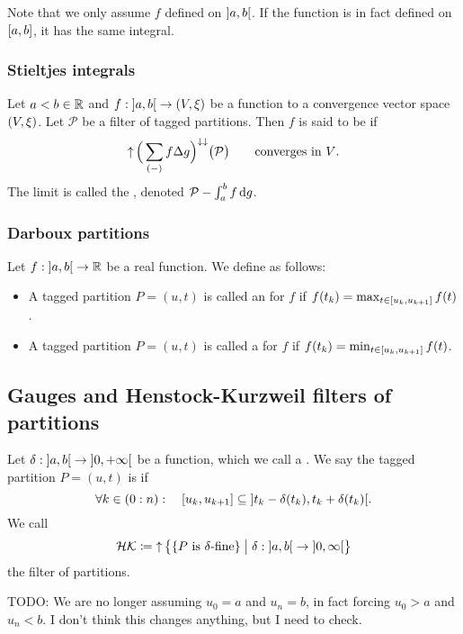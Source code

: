 Note that we only assume $f$ defined on $\interval[o]{a,b}$. If the function is in fact defined on $\interval{a,b}$, it has the same integral.

\subsubsection{Stieltjes integrals}
\begin{definition}
Let $a <  b\in \mathbb{R}$ and $f: \interval[o]{a,b}\to \sSet{V,\xi}$ be a function to a convergence vector space $\sSet{V,\xi}$. Let $\mathcal{P}$ be a filter of tagged partitions. Then $f$ is said to be  if 
\[ \operatorname{\uparrow}\Big(\sum_{(-)}f\Delta g\Big)^{\downarrow\downarrow}\big(\mathcal{P}\big)\qquad \text{converges in $V$.} \]
The limit is called the , denoted $\mathcal{P}-\int_a^b f\operatorname{d \!}{g}$.
\end{definition}

\subsubsection{Darboux partitions}
\begin{definition}
Let $f: \interval[o]{a,b}\to \R$ be a real function. We define  as follows:
\begin{itemize}
\item A tagged partition $P = (u,t)$ is called an  for $f$ if $f(t_k) = \max_{t\in \interval{u_k, u_{k+1}}}f(t)$.
\item A tagged partition $P = (u,t)$ is called a  for $f$ if $f(t_k) = \min_{t\in \interval{u_k, u_{k+1}}}f(t)$.
\end{itemize}
\end{definition}

\subsection{Gauges and Henstock-Kurzweil filters of partitions}
\begin{definition}
Let $\delta: \interval[o]{a,b}\to \interval[o]{0,+\infty}$ be a function, which we call a . We say the tagged partition $P = (u,t)$ is  if
\[ \forall k\in (0:n): \quad \interval{u_k, u_{k+1}} \subseteq \interval[o]{t_k-\delta(t_k), t_k+\delta(t_k)}. \]
We call
\[ \mathcal{HK} \defeq \upset \setbuilder[\big]{\{\text{$P$ is $\delta$-fine}\}}{\delta: \interval[o]{a,b}\to \interval[o]{0,\infty}} \]
the  filter of partitions.
\end{definition}
TODO: We are no longer assuming $u_0 = a$ and $u_{n} = b$, in fact forcing $u_0 > a$ and $u_n < b$. I don't think this changes anything, but I need to check.

